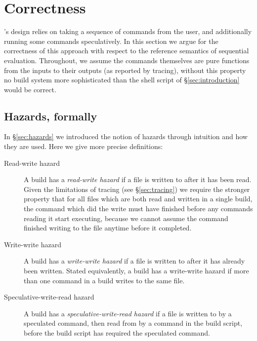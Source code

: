 
\renewcommand{\proof}{\vspace{1mm}\noindent \textbf{Proof}: }
\newcommand{\refutation}{\vspace{1mm}\noindent \textbf{Refutation}: }

\section{Correctness}
\label{sec:proof}

\newtheorem{claim}{Claim}

\Rattle's design relies on taking a sequence of commands from the user, and additionally running some commands speculatively. In this section we argue for the correctness of this approach with respect to the reference semantics of sequential evaluation. Throughout, we assume the commands themselves are pure functions from the inputs to their outputs (as reported by tracing), without this property no build system more sophisticated than the shell script of \S\ref{sec:introduction} would be correct.

\subsection{Hazards, formally}
\label{sec:hazards_formally}

In \S\ref{sec:hazards} we introduced the notion of hazards through
intuition and how they are used. Here we give more precise
definitions:

\begin{description}
\item[Read-write hazard] A build has a \emph{read-write hazard} if a file is written to after it has been read. Given the limitations of tracing (see \S\ref{sec:tracing}) we require the stronger property that for all files which are both read and written in a single build, the command which did the write must have finished before any commands reading it start executing, because we cannot assume the command finished writing to the file anytime before it completed.  %
\item[Write-write hazard] A build has a \emph{write-write hazard} if a file is written to after it has already been written. Stated equivalently, a build has a write-write hazard if more than one command in a build writes to the same file.
\item[Speculative-write-read hazard] A build has a \emph{speculative-write-read hazard} if a file is written to by a speculated command, then read from by a command in the build script, before the build script has required the speculated command.
\end{description}

